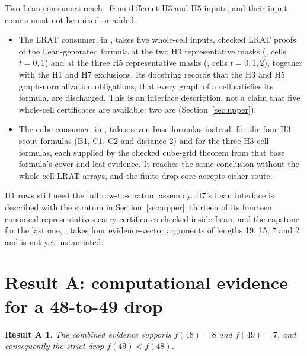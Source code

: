 \documentclass{anvil-paper}
\newcommand{\hnoFortyNine}{\lean{hno49}}
\newtheorem*{resultA}{Result A}
\theoremstyle{definition}
\begin{document}
Two Lean consumers reach \hnoFortyNine\ from different H3 and H5 inputs, and their input counts must not be mixed or added.
\begin{itemize}
\item The LRAT consumer,  in , takes five whole-cell inputs, checked LRAT proofs of the Lean-generated formula  at the two H3 representative masks (, cells $t=0,1$) and at the three H5 representative masks (, cells $t=0,1,2$), together with the H1 and H7 exclusions. Its docstring records that the H3 and H5 graph-normalization obligations, that every graph of a cell satisfies its formula, are discharged. This is an interface description, not a claim that five whole-cell certificates are available: two are (Section~\ref{sec:upper}).
\item The cube consumer,  in , takes seven base formulas instead:  for the four H3 scout formulas (B1, C1, C2 and distance 2) and for the three H5 cell formulas, each supplied by the checked cube-grid theorem from that base formula's cover and leaf evidence. It reaches the same conclusion without the whole-cell LRAT arrays, and the finite-drop core accepts either route.
\end{itemize}
H1 rows still need the full row-to-stratum assembly. H7's Lean interface is described with the stratum in Section~\ref{sec:upper}: thirteen of its fourteen canonical representatives carry certificates checked inside Lean, and the capstone for the last one, , takes four evidence-vector arguments of lengths 19, 15, 7 and 2 and is not yet instantiated.

\section{Result A: computational evidence for a 48-to-49 drop}\label{sec:resultA}

\begin{resultA}
The combined evidence supports $f(48)=8$ and $f(49)=7$, and consequently the strict drop $f(49)<f(48)$.
\end{resultA}
\end{document}
